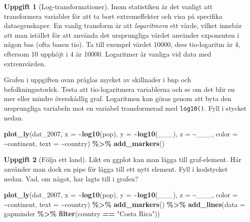 \documentclass[
]{book}
\newenvironment{Shaded}{\begin{snugshade}}{\end{snugshade}}
\newcommand{\AttributeTok}[1]{\textcolor[rgb]{0.13,0.29,0.53}{#1}}
\newcommand{\FunctionTok}[1]{\textcolor[rgb]{0.13,0.29,0.53}{\textbf{#1}}}
\newcommand{\NormalTok}[1]{#1}
\newcommand{\SpecialCharTok}[1]{\textcolor[rgb]{0.81,0.36,0.00}{\textbf{#1}}}
\newcommand{\StringTok}[1]{\textcolor[rgb]{0.31,0.60,0.02}{#1}}
\theoremstyle{definition}
\theoremstyle{definition}
\theoremstyle{definition}
\newtheorem{exercise}{Uppgift}[chapter]
\theoremstyle{definition}
\theoremstyle{remark}
\begin{document}
\begin{exercise}[Log-transformationer]

Inom statistiken är det vanligt att transformera variabler för att ta bort extremeffekter och visa på specifika dataegenskaper. En vanlig transform är att \emph{logaritmera} ett värde, vilket innebär att man istället för att använda det ursprungliga värdet använder exponenten i någon bas (ofta basen tio). Ta till exempel värdet 10000, dess tio-logaritm är 4, eftersom 10 upphöjt i 4 är 10000. Logaritmer är vanliga vid data med extremvärden.

Grafen i uppgiften ovan präglas mycket av skillnader i bnp och befolkningsstorlek. Testa att tio-logaritmera variablerna och se om det blir en mer eller mindre överskådlig graf. Logaritmen kan göras genom att byta den ursprungliga variabeln mot en variabel transformerad med \texttt{log10()}. Fyll i stycket nedan.

\begin{Shaded}
\begin{Highlighting}[]
\FunctionTok{plot\_ly}\NormalTok{(dat\_2007, }\AttributeTok{x =} \SpecialCharTok{\textasciitilde{}}\FunctionTok{log10}\NormalTok{(pop), }\AttributeTok{y =} \SpecialCharTok{\textasciitilde{}}\FunctionTok{log10}\NormalTok{(\_\_\_), }
        \AttributeTok{z =} \SpecialCharTok{\textasciitilde{}}\NormalTok{\_\_\_, }\AttributeTok{color =} \SpecialCharTok{\textasciitilde{}}\NormalTok{continent, }\AttributeTok{text =} \SpecialCharTok{\textasciitilde{}}\NormalTok{country) }\SpecialCharTok{\%\textgreater{}\%} 
  \FunctionTok{add\_markers}\NormalTok{()}
\end{Highlighting}
\end{Shaded}

\end{exercise}

\begin{exercise}[Följa ett land]

Likt en ggplot kan man lägga till graf-element. Här använder man dock en pipe för lägga till ett nytt element. Fyll i kodstycket nedan. Vad, om något, har lagts till i grafen?

\begin{Shaded}
\begin{Highlighting}[]
\FunctionTok{plot\_ly}\NormalTok{(dat\_2007, }\AttributeTok{x =} \SpecialCharTok{\textasciitilde{}}\FunctionTok{log10}\NormalTok{(pop), }\AttributeTok{y =} \SpecialCharTok{\textasciitilde{}}\FunctionTok{log10}\NormalTok{(\_\_\_), }
        \AttributeTok{z =} \SpecialCharTok{\textasciitilde{}}\NormalTok{\_\_\_, }\AttributeTok{color =} \SpecialCharTok{\textasciitilde{}}\NormalTok{continent, }\AttributeTok{text =} \SpecialCharTok{\textasciitilde{}}\NormalTok{country) }\SpecialCharTok{\%\textgreater{}\%} 
  \FunctionTok{add\_markers}\NormalTok{() }\SpecialCharTok{\%\textgreater{}\%} 
  \FunctionTok{add\_lines}\NormalTok{(}\AttributeTok{data =}\NormalTok{ gapminder }\SpecialCharTok{\%\textgreater{}\%} \FunctionTok{filter}\NormalTok{(country }\SpecialCharTok{==} \StringTok{"Costa Rica"}\NormalTok{))}
\end{Highlighting}
\end{Shaded}

\end{exercise}
\end{document}
